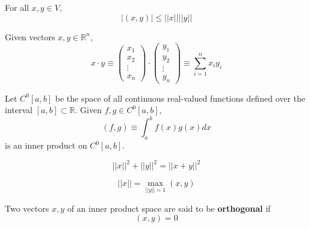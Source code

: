   \begin{theorem}
    For all $x, y \in V$, 
    \begin{equation}
      |(x, y)| \leq ||x|| ||y||
    \end{equation}
  \end{theorem}

  \begin{example}
    Given vectors $x, y \in \mathbb{R}^n$, 
    \begin{equation}
      x \cdot y \equiv  \begin{pmatrix}
      x_1\\x_2\\\vdots\\x_n
      \end{pmatrix} \cdot \begin{pmatrix}
      y_1\\y_2\\\vdots\\y_n
      \end{pmatrix} \equiv \sum_{i=1}^n x_i y_i
    \end{equation}
  \end{example}

  \begin{example}
    Let $C^0[a, b]$ be the space of all continuous real-valued functions defined over the interval $[a,b] \subset \mathbb{R}$. Given $f, g \in C^0[a,b]$, 
    \begin{equation}
      (f, g) \equiv \int_a^b f(x)g(x) d x
    \end{equation}
    is an inner product on $C^0[a, b]$. 
  \end{example}

  \begin{theorem}
    \begin{equation}
      ||x||^2 + ||y||^2 = ||x+y||^2
    \end{equation}
  \end{theorem}

  \begin{theorem}
    \begin{equation}
      ||x|| = \max_{||y||=1} (x, y)
    \end{equation}
  \end{theorem}

  \begin{definition}
    Two vectors $x, y$ of an inner product space are said to be \textbf{orthogonal} if 
    \begin{equation}
      (x, y) = 0
    \end{equation}
  \end{definition}

